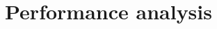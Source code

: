\documentclass[journal]{IEEEtran}
\begin{document}
%


 







\section{Performance analysis}
\end{document}
